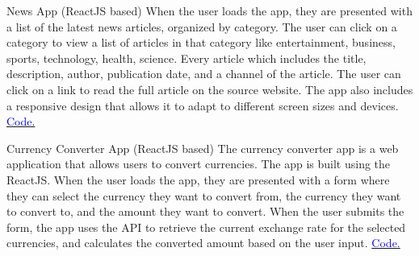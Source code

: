     {News App (ReactJS based)}
    {}
    {}
    {}
    {When the user loads the app, they are presented with a list of the latest news articles, organized by category. The user can click on a category to view a list of articles in that category like entertainment, business, sports, technology, health, science. Every article which includes the title, description, author, publication date, and a channel of the article. The user can click on a link to read the full article on the source website. The app also includes a responsive design that allows it to adapt to different screen sizes and devices.   
        \hfill
        \href{https://github.com/simranlotey/react-news-app.git}{\textcolor{blue}{\scriptsize Code.}}
    }
    \vspace*{0.2\baselineskip}


    {Currency Converter App (ReactJS based)}
    {}
    {}
    {}
    {The currency converter app is a web application that allows users to convert currencies. The app is built using the ReactJS. When the user loads the app, they are presented with a form where they can select the currency they want to convert from, the currency they want to convert to, and the amount they want to convert. When the user submits the form, the app uses the API to retrieve the current exchange rate for the selected currencies, and calculates the converted amount based on the user input.
        \hfill
        \href{https://github.com/simranlotey/react-currency-converter.git}{\textcolor{blue}{\scriptsize Code.}}
    }
    \vspace*{0.2\baselineskip}
